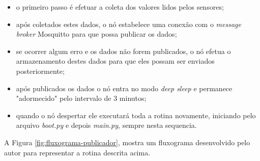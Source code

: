 \begin{itemize}
    \item o primeiro passo é efetuar a coleta dos valores lidos pelos sensores;
    \item após coletados estes dados, o nó estabelece uma conexão com o \textit{message broker} Mosquitto para que possa publicar os dados;
    \item se ocorrer algum erro e os dados não forem publicados, o nó efetua o armazenamento destes dados para que eles possam ser enviados posteriormente;
    \item após publicados os dados o nó entra no modo \textit{deep sleep} e permanece "adormecido" pelo intervalo de 3 minutos;
    \item quando o nó despertar ele executará toda a rotina novamente, iniciando pelo arquivo \textit{boot.py} e depois \textit{main.py}, sempre nesta sequencia.
\end{itemize}

A Figura \ref{fig:fluxograma-publicador}, mostra um fluxograma desenvolvido pelo autor para representar a rotina descrita acima.

